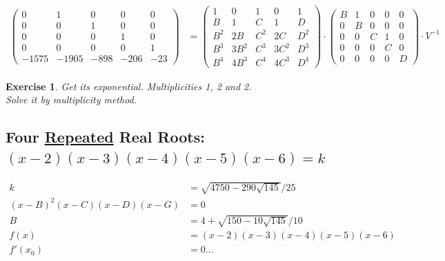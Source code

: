 \documentclass[12pt,a4paper]{article}
\newtheorem{exercise}{Exercise}[section]
\begin{document}
\begin{align}
\left( \begin{matrix} 0&1&0&0&0 \\ 0&0&1&0&0 \\ 0&0&0&1&0 \\ 0&0&0&0&1 \\ -1575 & -1905 & -898 & -206 & -23 \end{matrix} \right)
&=
\left( \begin{matrix} 1&0&1&0&1 \\ B&1&C&1&D \\ B^2&2B&C^2&2C&D^2 \\ B^3&3B^2&C^3&3C^2&D^3 \\ B^4&4B^3&C^4&4C^3&D^4 \end{matrix} \right) \cdot
\left( \begin{matrix} B & 1&0&0&0 \\ 0 & B&0&0&0 \\ 0 & 0 & C & 1 & 0 \\ 0 & 0 & 0 & C & 0 \\ 0 & 0 & 0 & 0 & D \end{matrix} \right) \cdot V^{-1}
\end{align}

\begin{exercise}
Get its exponential. Multiplicities 1, 2 and 2. \\
Solve it by multiplicity method.
\end{exercise}

\subsection{Four \href{}{Repeated} Real Roots: $(x-2)(x-3)(x-4)(x-5)(x-6) = k$}

\begin{align}
k &=  \sqrt{4750 - 290 \sqrt{145}}/25 \\
(x - B)^2 (x - C)(x - D)(x - G) &= 0 \\
B &= 4 + \sqrt{150 - 10 \sqrt{145}} / 10 \\
f(x) &= (x - 2)(x - 3)(x - 4)(x - 5)(x - 6) \\
f'(x_0) &= 0 ...
\end{align}
\end{document}
